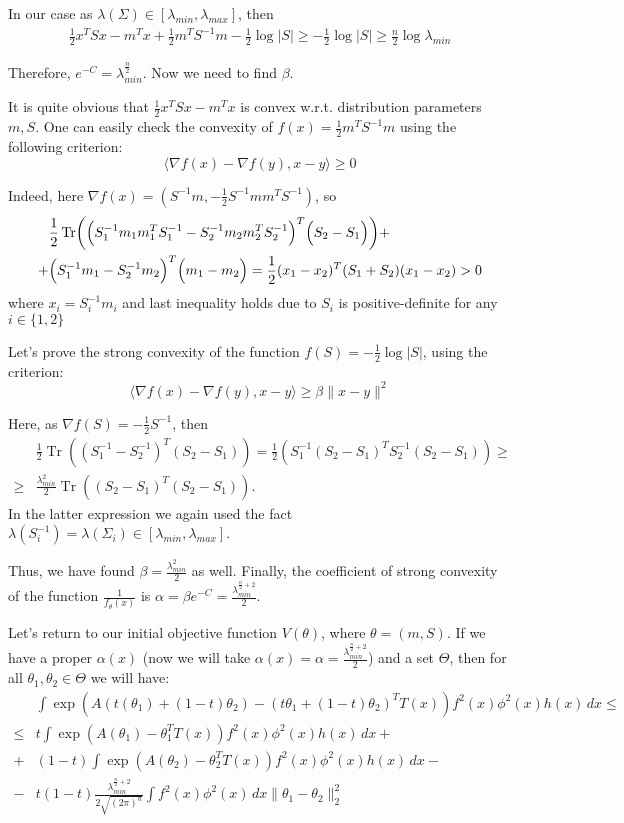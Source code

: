 \documentclass{article}
\DeclareMathOperator{\trace}{Tr}
\begin{document}
In our case as $\lambda(\Sigma) \in [\lambda_{min}, \lambda_{max}]$, then
\begin{align*}
    \frac 12 x^T Sx - m^Tx + \frac 12 m^TS^{-1}m - \frac 12 \log|S| \geq -\frac 12 \log |S| \geq \frac n2 \log \lambda_{min}
\end{align*}

Therefore, $e^{-C} = \lambda_{min}^{\frac n2}$. Now we need to find $\beta$.

It is quite obvious that $\frac 12 x^T Sx - m^Tx$ is convex w.r.t. distribution parameters $m, S$. One can easily check the convexity of $f(x) = \frac 12 m^TS^{-1}m$ using the following criterion:
\[
\langle \nabla f(x) - \nabla f(y), x-y \rangle \geq 0
\]

Indeed, here $\nabla f(x) = (S^{-1}m, - \frac 12 S^{-1} mm^TS^{-1})$, so 
\begin{align*}
&\frac 12 \trace\biggl( \Bigl( S_1^{-1} m_1m_1^TS_1^{-1} - S_2^{-1}m_2m_2^TS_2^{-1}\Bigr)^T\Bigl( S_2 -S_1 \Bigr) \biggr) + \\ 
+ &\Bigl( S_1^{-1} m_1 - S_2^{-1} m_2\Bigr)^T \Bigl( m_1-m_2 \Bigr)  = \frac 12 (x_1 - x_2)^T(S_1 + S_2)(x_1-x_2) > 0
\end{align*}
where $x_i = S_i^{-1}m_i$ and last inequality holds due to $S_i$ is positive-definite for any $i \in \{1,2\}$ 
 
Let's prove the strong convexity of the function $f(S) = - \frac 12 \log |S|$, using the criterion:
\[
\langle \nabla f(x) - \nabla f(y), x-y \rangle \geq \beta \|x-y \|^2
\]

Here, as $\nabla f(S) = - \frac 12 S^{-1}$, then
\begin{align*}
&\frac12 \trace ((S_1^{-1}- S_2^{-1})^T(S_2 - S_1)) = \frac 12 (S_1^{-1}(S_2-S_1)^TS_2^{-1}(S_2 -S_1)) \geq \\
\geq & \frac{\lambda_{min}^2}{2}\trace((S_2 - S_1)^T(S_2-S_1)).
\end{align*}
In the latter expression we again used the fact $\lambda(S_i^{-1}) = \lambda(\Sigma_i) \in \left[\lambda_{min}, \lambda_{max} \right]$.

Thus, we have found $\beta = \frac{\lambda_{min}^2}{2}$
as well. Finally, the coefficient of strong convexity of the function $\frac1{f_{\theta}(x)}$ is $\alpha= \beta e^{-C}= \frac{\lambda_{min}^{\frac{n}{2} + 2}}{2}$.

Let's return to our initial objective function $V(\theta)$, where $\theta = (m,S)$. If we have a proper $\alpha(x)$ (now we will take $\alpha(x) = \alpha = \frac{\lambda_{min}^{\frac{n}{2} +2}}{2}$) and a set $\Theta$, then for all $\theta_1, \theta_2 \in \Theta$ we will have:
\begin{align*}
&\int \exp(A(t(\theta_1) + (1-t)\theta_2) - (t\theta_1 + (1-t)\theta_2)^TT(x))f^2(x)\phi^2(x)h(x)\, d x  \leq\\
\leq &t \int \exp(A(\theta_1) - \theta_1^TT(x))f^2(x)\phi^2(x)h(x)\, d x +\\
+&(1-t) \int \exp(A(\theta_2) - \theta_2^TT(x))f^2(x)\phi^2(x)h(x)\, d x -\\
-&t(1-t) \frac{\lambda_{min}^{\frac n2 + 2}}{2\sqrt{(2\pi)^n}} \int f^2(x)\phi^2(x)\, dx \|\theta_1 - \theta_2\|^2_2
\end{align*}
\end{document}
